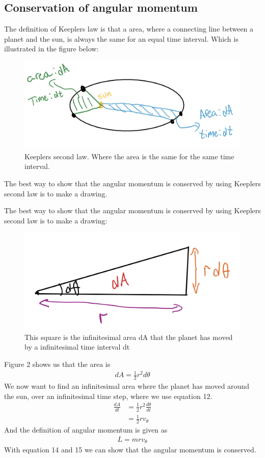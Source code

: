 \documentclass{article}
\begin{document}
\begin{multicols}{2}
\subsection{Conservation of angular momentum}
The definition of Keeplers law is that a area, where a connecting line between a planet and the sun, is always the same for an equal time interval. Which is illustrated in the figure below:


\begin{figure}[H]
	\centering
	\includegraphics[width=\linewidth]{K2L.jpg}
	\caption{Keeplers second law. Where the area is the same for the same time interval.}
	\label{fig:1bplot}
\end{figure}

The best way to show that the angular momentum is conserved by using Keeplers second law is to make a drawing.


The best way to show that the angular momentum is conserved by using Keeplers second law is to make a drawing:

\begin{figure}[H]
	\centering
	\includegraphics[width=\linewidth]{sketch.jpg}
	\caption{This square is the infinitesimal area dA that the planet has moved by a infinitesimal time interval dt}
	\label{fig:1bplot}
\end{figure}
Figure 2 shows us that the area is 
\begin{align}
    dA=\frac{1}{2}r^2d\theta
\end{align}
We now want to find an infinitesimal area where the planet has moved around the sun, over an infinitesimal time step, where we use equation 12.
\begin{align}
    \frac{dA}{dt}&=\frac{1}2{r^2}\frac{d\theta}{dt}\\
    &=\frac{1}{2}rv_\theta
\end{align}
And the definition of angular momentum is given as
\begin{align}
    L=mrv_\theta
\end{align}
With equation 14 and 15 we can show that the angular momentum is conserved.  

\end{multicols}
\end{document}
